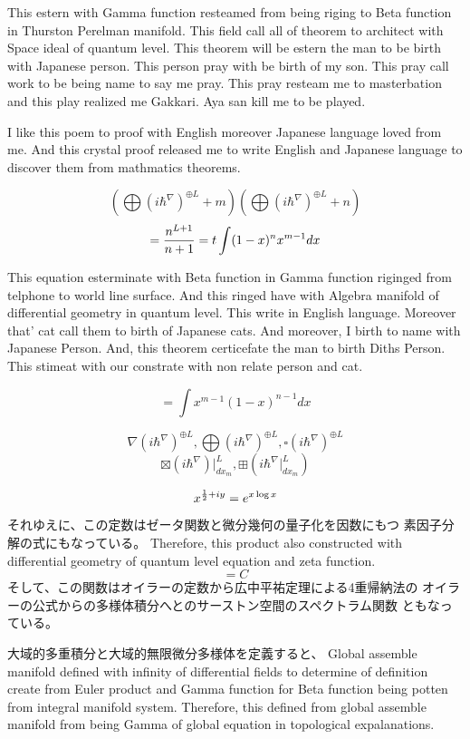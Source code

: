 \documentclass{jsarticle}
\begin{document}
       This estern with Gamma function resteamed from being riging to Beta function in Thurston
   Perelman manifold. This field call all of theorem to architect with Space ideal of quantum level.
     This theorem will be estern the man to be birth with Japanese person.
   This person pray with be birth of my son.
   This pray call work to be being name to say me pray.
   This pray resteam me to masterbation and this play realized me Gakkari.
   Aya san kill me to be played.

     I like this poem to proof with English moreover Japanese language loved from me.
     And this crystal proof released me to write English and Japanese language to discover them
     from mathmatics theorems.

   $$ \left(\bigoplus({i \hbar^{\nabla}})^{\oplus L}+m\right) 
   \left(\bigoplus({i \hbar^{\nabla}})^{\oplus L}+n\right) $$
  $$ = {n^{L+1} \over {n+1}} = t \int (1 - x)^n x^{m - 1} dx $$



     This equation esterminate with Beta function in Gamma function riginged from telphone
  to world line surface. And this ringed have with Algebra manifold of differential geometry in
  quantum level. This write in English language. Moreover that' cat call them to birth of Japanese cats.
  And moreover, I birth to name with Japanese Person. 
  And, this theorem certicefate the man to birth Diths Person.
  This stimeat with our constrate with non relate person and cat.


  $$ = \int x^{m-1}(1 - x)^{n-1} dx $$


  $$ \nabla ({i \hbar^{\nabla}})^{\oplus L}, \bigoplus ({i \hbar^{\nabla}})^{
	   \oplus L}, \square ({i \hbar^{\nabla}})^{\oplus L} $$
   $$ \boxtimes (i \hbar^{\nabla})|_{dx_m}^L, \boxplus (i \hbar^{\nabla}|_
   {dx_m}^L) $$



  $$ x^{{1 \over 2} + iy} = e^{x \log x} $$
  それゆえに、この定数はゼータ関数と微分幾何の量子化を因数にもつ
  素因子分解の式にもなっている。
  Therefore, this product also constructed with differential geometry
  of quantum level equation and zeta function.
  $$ = C $$ 
  そして、この関数はオイラーの定数から広中平祐定理による4重帰納法の
  オイラーの公式からの多様体積分へとのサーストン空間のスペクトラム関数
  ともなっている。
  

       大域的多重積分と大域的無限微分多様体を定義すると、
   Global assemble manifold defined with infinity of differential
   fields to determine of definition create from Euler product and
   Gamma function for Beta function being potten from integral manifold
   system. Therefore, this defined from global assemble manifold from
   being Gamma of global equation in topological expalanations.
\end{document}
